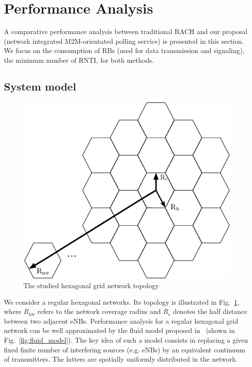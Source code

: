 \section{Performance Analysis}
\label{analysis}
A comparative performance analysis between traditional RACH and our proposal (network integrated M2M-orientated polling service) is presented in this section. We focus on the consumption of RBs  (used for data transmission and signaling), the minimum number of RNTI, for both methods.

\subsection{System model}
\begin{figure}[!t]
	\centering
	\includegraphics[width=0.9\linewidth]{Chapter6/Figures/hexagone_grid}
	\caption{The studied hexagonal grid network topology}
	\label{fig:hexagone_grid}
\end{figure}
We consider a regular hexagonal networks. Its topology is illustrated in Fig.~\ref{fig:hexagone_grid}, where $R_{\text{nw}}$ refers to the network coverage radius and $R_c$ denotes the half distance between two adjacent eNBs.
Performance analysis for a regular hexagonal grid network can be well approximated by the fluid model proposed in~\cite{kelif2010fluid} (shown in Fig.~\ref{fig:fluid_model}). The key idea of such a model consists in replacing a given fixed finite number of interfering sources (e.g. eNBs) by an equivalent continuum of transmitters. The latters are spatially uniformly distributed in the network.

